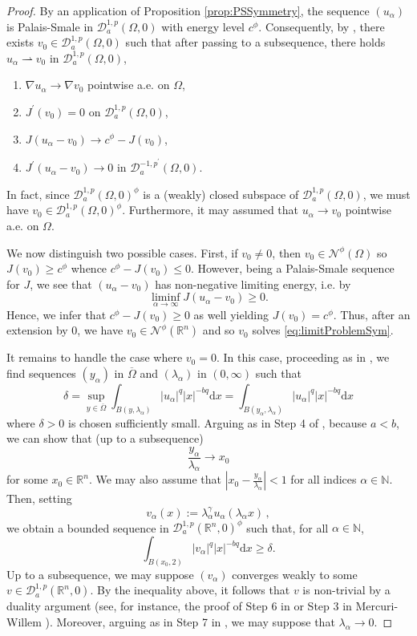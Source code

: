 \documentclass[10pt, reqno]{amsart}
\newcommand{\NN}{\mathbb{N}}
\newcommand{\RR}{\mathbb{R}}
\newcommand{\Om}{\Omega}
\newcommand{\abs}[1]{\left\vert #1 \right\vert}
\newcommand{\D}{\mathcal{D}}
\newcommand{\N}{\mathcal{N}}
\renewcommand{\d}{\mathrm{d}}
\numberwithin{equation}{section}
\theoremstyle{definition}
\theoremstyle{remark}
\theoremstyle{plain}
\begin{document}
	\begin{proof}
		By an application of Proposition \ref{prop:PSSymmetry}, the sequence $(u_\alpha)$ is Palais-Smale in $\D_a^{1,p}(\Om,0)$ with energy level $c^\phi$. Consequently, by \cite[Lemma 6.1]{Chernysh}, there exists $v_0 \in \D_a^{1,p} (\Om,0)$ such that after passing to a subsequence, there holds $u_\alpha \rightharpoonup v_0$ in $\D_a^{1,p} (\Om,0)$,
		\begin{enumerate}
			\item $\nabla u_\alpha \to \nabla v_0$ pointwise a.e. on $\Om$,
			\item $J^\prime(v_0) = 0$ on $\D_a^{1,p}(\Om,0)$,
			\item $J(u_\alpha - v_0) \to c^\phi - J(v_0)$,
			\item $J^\prime(u_\alpha - v_0) \to 0$ in $\D_a^{-1,p^\prime}(\Om,0)$.
		\end{enumerate}
		In fact, since $\D_a^{1,p} (\Om,0)^\phi$ is a (weakly) closed subspace of $\D_a^{1,p} (\Om,0)$, we must have $v_0 \in \D_a^{1,p} (\Om,0)^\phi$. Furthermore, it may assumed that $u_\alpha \to v_0$ pointwise a.e. on $\Om$. 
		
		We now distinguish two possible cases. First, if $v_0 \ne 0$, then $v_0 \in \N^\phi(\Om)$ so $J(v_0) \ge c^\phi$ whence $c^\phi - J(v_0) \le 0$. However, being a Palais-Smale sequence for $J$, we see that $(u_\alpha - v_0)$ has non-negative limiting energy, i.e. by \cite[Lemma 2.4]{Chernysh}
		\[
		\liminf_{\alpha \to \infty} J(u_\alpha - v_0) \ge 0.
		\]
		Hence, we infer that $c^\phi - J(v_0) \ge 0$ as well yielding $J(v_0) = c^\phi$. Thus, after an extension by $0$, we have $v_0 \in \N^\phi(\RR^n)$ and so $v_0$ solves \eqref{eq:limitProblemSym}. 
		
		It remains to handle the case where $v_0 = 0$. In this case, proceeding as in \cite[Theorem 1]{Chernysh}, we find sequences $(y_\alpha)$ in $\overline{\Om}$ and $(\lambda_\alpha)$ in $(0, \infty)$ such that
		\[
		\delta = \sup_{y\in\overline{\Om}}\int_{B(y, \lambda_\alpha)}\abs{u_\alpha}^q\abs{x}^{-bq}\d{x} = \int_{B(y_\alpha, \lambda_\alpha)}\abs{u_\alpha}^q\abs{x}^{-bq}\d{x}
		\]
		where $\delta > 0$ is chosen sufficiently small. Arguing as in Step 4 of \cite[Theorem 1]{Chernysh}, because $a < b$, we can show that (up to a subsequence)
		\[
		\frac{y_\alpha}{\lambda_\alpha} \to x_0
		\]
		for some $x_0\in\RR^n$. We may also assume that $\abs{x_0 - \frac{y_\alpha}{\lambda_\alpha}} < 1$ for all indices $\alpha \in \NN$. Then, setting
		\[
		v_\alpha(x) := \lambda_\alpha^{\gamma}u_\alpha(\lambda_\alpha x)\,,
		\]
		we obtain a bounded sequence in $\D_a^{1,p}(\RR^n,0)^\phi$ such that, for all $\alpha \in \NN$,
		\[
		\int_{B(x_0, 2)}\abs{v_\alpha}^q\abs{x}^{-bq}\d{x} \ge \delta.
		\] 
		Up to a subsequence, we may suppose $(v_\alpha)$ converges weakly to some $v \in \D_a^{1,p}(\RR^n, 0)$. By the inequality above, it follows that $v$ is non-trivial by a duality argument (see, for instance, the proof of Step 6 in \cite[Theorem 1]{Chernysh} or Step 3 in Mercuri-Willem \cite[Theorem 1.2]{mercuri-willem}). Moreover, arguing as in Step 7 in \cite[Theorem 1]{Chernysh}, we may suppose that $\lambda_\alpha \to 0$.
		

\end{proof}
\end{document}
